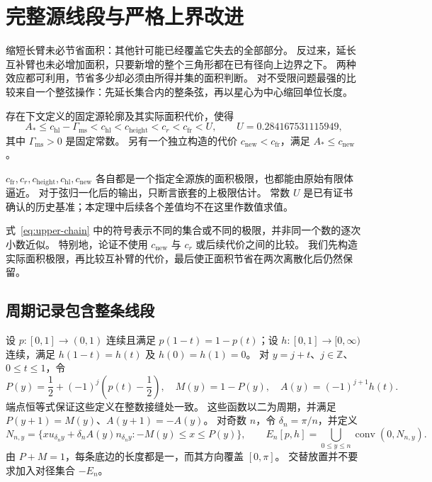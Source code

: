
\section{完整源线段与严格上界改进}
\label{sec:upper-constructions}

缩短长臂未必节省面积：其他针可能已经覆盖它失去的全部部分。
反过来，延长互补臂也未必增加面积，只要新增的整个三角形都在已有径向上边界之下。
两种效应都可利用，节省多少却必须由所得并集的面积判断。
对不受限问题最强的比较来自一个整弦操作：先延长集合内的整条弦，再以星心为中心缩回单位长度。

\begin{theorem}[严格上界构造]\label{thm:upper-chain}
存在下文定义的固定源轮廓及其实际面积代价，使得
\begin{equation}\label{eq:upper-chain}
 A_*\le c_{\mathrm{hl}}-\Gamma_{\mathrm{ms}}
 <c_{\mathrm{hl}}<c_{\mathrm{height}}<c_r<c_{\mathrm{fr}}<U,
 \qquad U=0.284167531115949,
\end{equation}
其中 $\Gamma_{\mathrm{ms}}>0$ 是固定常数。
另有一个独立构造的代价 $c_{\mathrm{new}}<c_{\mathrm{fr}}$，满足 $A_*\le c_{\mathrm{new}}$。

$c_{\mathrm{fr}},c_r,c_{\mathrm{height}},c_{\mathrm{hl}},c_{\mathrm{new}}$ 各自都是一个指定全源族的面积极限，也都能由原始有限体逼近。
对于弦归一化后的输出，只断言嵌套的上极限估计。
常数 $U$ 是已有证书确认的历史基准；本定理中后续各个差值均不在这里作数值求值。
\end{theorem}

式~\eqref{eq:upper-chain} 中的符号表示不同的集合或不同的极限，并非同一个数的逐次小数近似。
特别地，论证不使用 $c_{\mathrm{new}}$ 与 $c_r$ 或后续代价之间的比较。
我们先构造实际面积极限，再比较互补臂的代价，最后使正面积节省在两次离散化后仍然保留。

\subsection{周期记录包含整条线段}
\label{subsec:upper-periodic}

设 $p:[0,1]\to(0,1)$ 连续且满足 $p(1-t)=1-p(t)$；设 $h:[0,1]\to[0,\infty)$ 连续，满足 $h(1-t)=h(t)$ 及 $h(0)=h(1)=0$。
对 $y=j+t$、$j\in\mathbb Z$、$0\le t\le1$，令
\begin{equation}\label{eq:upper-periodic-data}
 P(y)=\frac12+(-1)^j\left(p(t)-\frac12\right),
 \quad M(y)=1-P(y),\quad A(y)=(-1)^{j+1}h(t).
\end{equation}
端点恒等式保证这些定义在整数接缝处一致。
这些函数以二为周期，并满足 $P(y+1)=M(y)$、$A(y+1)=-A(y)$。
对奇数 $n$，令 $\delta_n=\pi/n$，并定义
\begin{equation}\label{eq:upper-actual-source}
 N_{n,y}=\{xu_{\delta_n y}+\delta_n A(y)n_{\delta_n y}:
                 -M(y)\le x\le P(y)\},\qquad
 E_n[p,h]=\bigcup_{0\le y\le n}\operatorname{conv}(0,N_{n,y}).
\end{equation}
由 $P+M=1$，每条底边的长度都是一，而其方向覆盖 $[0,\pi]$。
交替放置并不要求加入对径集合 $-E_n$。

